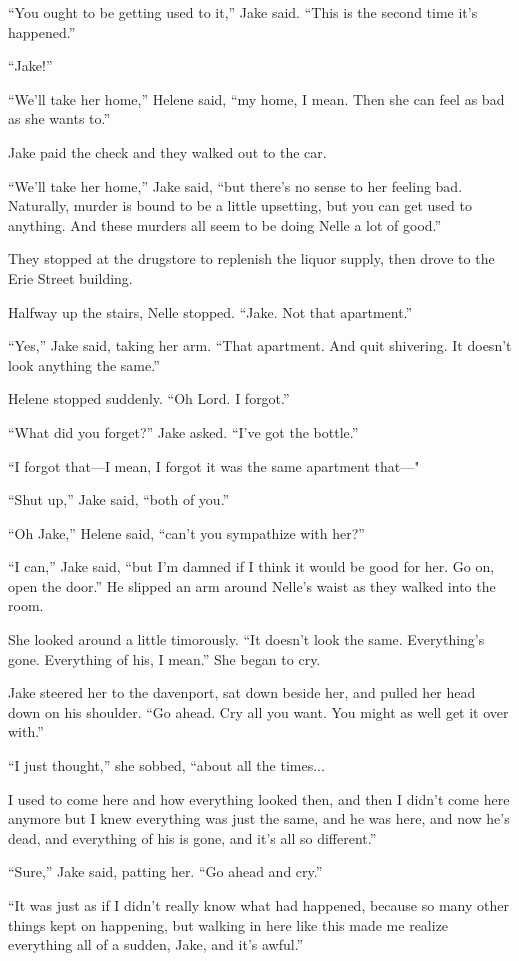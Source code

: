 \documentclass{novel}
\begin{document}
“You ought to be getting used to it,” Jake said. “This is the second time it’s happened.”

“Jake!”

“We’ll take her home,” Helene said, “my home, I mean. Then she can feel as bad as she wants to.”

Jake paid the check and they walked out to the car.

“We’ll take her home,” Jake said, “but there’s no sense to her feeling bad. Naturally, murder is bound to be a little upsetting, but you can get used to anything. And these murders all seem to be doing Nelle a lot of good.”

They stopped at the drugstore to replenish the liquor supply, then drove to the Erie Street building.

Halfway up the stairs, Nelle stopped. “Jake. Not that apartment.”

“Yes,” Jake said, taking her arm. “That apartment. And quit shivering. It doesn’t look anything the same.”

Helene stopped suddenly. “Oh Lord. I forgot.”

“What did you forget?” Jake asked. “I’ve got the bottle.”

“I forgot that—I mean, I forgot it was the same apartment that—"

“Shut up,” Jake said, “both of you.”

“Oh Jake,” Helene said, “can’t you sympathize with her?”

“I can,” Jake said, “but I’m damned if I think it would be good for her. Go on, open the door.” He slipped an arm around Nelle’s waist as they walked into the room.

She looked around a little timorously. “It doesn’t look the same. Everything’s gone. Everything of his, I mean.” She began to cry.

Jake steered her to the davenport, sat down beside her, and pulled her head down on his shoulder. “Go ahead. Cry all you want. You might as well get it over with.”

“I just thought,” she sobbed, “about all the times...

I used to come here and how everything looked then, and then I didn’t come here anymore but I knew everything was just the same, and he was here, and now he’s dead, and everything of his is gone, and it’s all so different.”

“Sure,” Jake said, patting her. “Go ahead and cry.”

“It was just as if I didn’t really know what had happened, because so many other things kept on happening, but walking in here like this made me realize everything all of a sudden, Jake, and it’s awful.”
\end{document}
